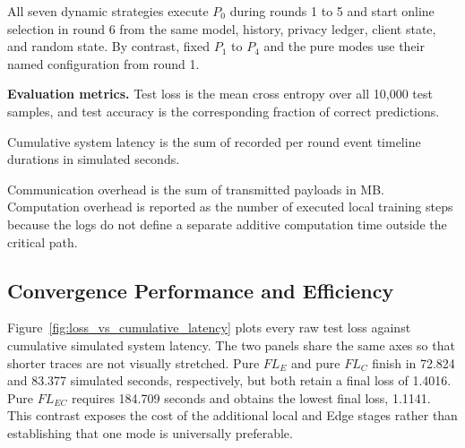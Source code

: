 \documentclass[5p,times]{elsarticle}
\newif\ifshowcomments
\newcommand{\cncomment}[1]{%
  \ifshowcomments
    \textcolor{red}{\textbf{【作者批注：#1】}%
  }\fi
}
\theoremstyle{plain}
\theoremstyle{definition}
\theoremstyle{remark}
\begin{document}
All seven dynamic strategies execute $P_0$ during rounds 1 to 5 and
start online selection in round 6 from the same model, history,
privacy ledger, client state, and random state.  By contrast, fixed
$P_1$ to $P_4$ and the pure modes use their named configuration from
round 1. 

\textbf{Evaluation metrics.}
Test loss is the mean cross entropy over all 10,000 test samples, and
test accuracy is the corresponding fraction of correct predictions.\cncomment{这个test accuracy有必要解释吗？我也不清楚Test loss和test accuracy相比哪个更有说服力}
Cumulative system latency is the sum of recorded per round event
timeline durations in simulated seconds. \cncomment{有更体面的说法吗，我们一直在用simulated，如果非要说写为“仿真时间”}  Communication overhead is
the sum of transmitted payloads in MB.  Computation overhead is
reported as the number of executed local training steps because the
logs do not define a separate additive computation time outside the
critical path.

\cncomment{之后的内容主要是图需要需要大改，图改好内容才知道要围绕什么图说，还有就是不要一股脑把所有图都堆叠在一起，最好是能够跟段落距离不会太远.}
\cncomment{审稿人看到我们的实验之后无疑会发出疑问，复杂模型还适用吗，因此我们之后还要补上关于复杂数据集cifar10和resnet18的实验}

\subsection{Convergence Performance and Efficiency}
\label{sec:exp_convergence}
\label{sec:main_comparison}

Figure~\ref{fig:loss_vs_cumulative_latency} plots every raw test loss
against cumulative simulated system latency.  The two panels share
the same axes so that shorter traces are not visually stretched.
Pure $FL_E$ and pure $FL_C$ finish in 72.824 and 83.377 simulated
seconds, respectively, but both retain a final loss of 1.4016.
Pure $FL_{EC}$ requires 184.709 seconds and obtains the lowest final
loss, 1.1141.  This contrast exposes the cost of the additional local
and Edge stages rather than establishing that one mode is universally
preferable.
\end{document}
